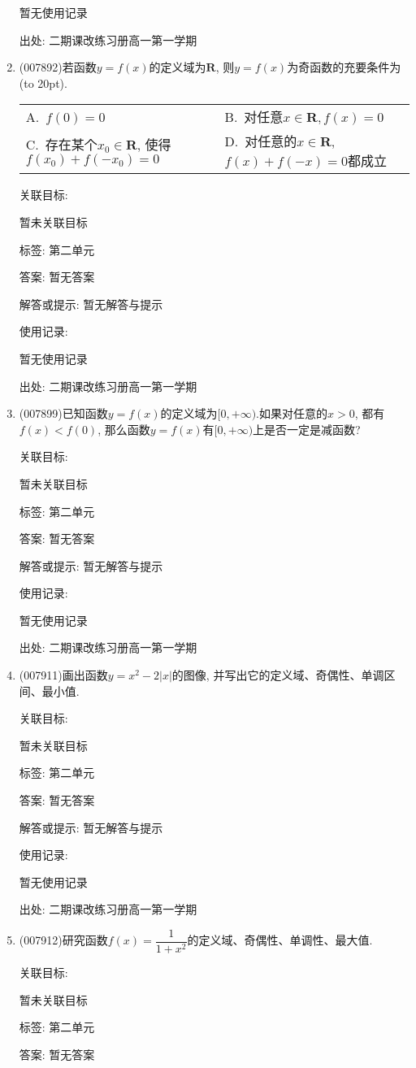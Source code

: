 \documentclass[10pt,a4paper]{article}
\newcommand{\bracket}[1]{(\hbox to #1pt{})}
\newcommand{\twoch}[4]{\par\begin{tabular}{p{.46\textwidth}p{.46\textwidth}}
A.~#1& B.~#2\\
C.~#3& D.~#4
\end{tabular}}
\begin{document}
\begin{enumerate}[1.]
暂无使用记录


出处: 二期课改练习册高一第一学期
\item { (007892)}若函数$y=f(x)$的定义域为$\mathbf{R}$, 则$y=f(x)$为奇函数的充要条件为\bracket{20}.
\twoch{$f(0)=0$}{对任意$x\in \mathbf{R},f(x)=0$}{存在某个$x_0\in \mathbf{R}$, 使得$f(x_0)+f(-x_0)=0$}{对任意的$x\in \mathbf{R}$, $f(x)+f(-x)=0$都成立}


关联目标:

暂未关联目标



标签: 第二单元

答案: 暂无答案

解答或提示: 暂无解答与提示

使用记录:

暂无使用记录


出处: 二期课改练习册高一第一学期
\item { (007899)}已知函数$y=f(x)$的定义域为$[0,+\infty)$.如果对任意的$x>0$, 都有$f(x)<f(0)$, 那么函数$y=f(x)$有$[0,+\infty)$上是否一定是减函数?


关联目标:

暂未关联目标



标签: 第二单元

答案: 暂无答案

解答或提示: 暂无解答与提示

使用记录:

暂无使用记录


出处: 二期课改练习册高一第一学期
\item { (007911)}画出函数$y=x^2-2|x|$的图像, 并写出它的定义域、奇偶性、单调区间、最小值.


关联目标:

暂未关联目标



标签: 第二单元

答案: 暂无答案

解答或提示: 暂无解答与提示

使用记录:

暂无使用记录


出处: 二期课改练习册高一第一学期
\item { (007912)}研究函数$f(x)=\dfrac 1{1+x^2}$的定义域、奇偶性、单调性、最大值.


关联目标:

暂未关联目标



标签: 第二单元

答案: 暂无答案


\end{enumerate}
\end{document}
